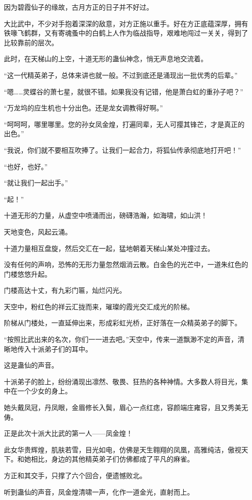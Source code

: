 \begin{this_body}
因为碧霞仙子的缘故，古月方正的日子并不好过。

大比武中，不少对手抱着深深的敌意，对方正施以重手。好在方正底蕴深厚，拥有铁喙飞鹤群，又有寄魂蚤中的白鹤上人作为临战指导，艰难地闯过一关关，得到了比较靠前的层次。

此时，在天梯山的上空，十道无形的蛊仙神念，悄无声息地交流着。

“这一代精英弟子，总体来讲也就一般。不过到底还是涌现出一批优秀的后辈。”

“嗯……灵蝶谷的萧七星，就很不错。如果我没有记错，他是萧白虹的重孙子吧？”

“万龙坞的应生机也十分出色。还是龙女调教得好啊。”

“呵呵呵，哪里哪里。您的孙女凤金煌，打遍同辈，无人可撄其锋芒，才是真正的出色。”

“我说，你们就不要相互吹捧了。让我们一起合力，将狐仙传承彻底地打开吧！”

“也好，也好。”

“就让我们一起出手。”

“起！”

十道无形的力量，从虚空中喷涌而出，磅礴浩瀚，如海啸，如山洪！

天地变色，风起云涌。

十道力量相互盘旋，然后交汇在一起，猛地朝着天梯山某处冲撞过去。

没有任何的声响，恐怖的无形力量忽然烟消云散。白金色的光芒中，一道朱红色的门楼悠悠升起。

门楼高达十丈，有九彩门匾，灿烂闪光。

天空中，粉红色的祥云汇拢而来，璀璨的霞光交汇成光的阶梯。

阶梯从门楼处，一直延伸出来，形成彩虹光桥，正好落在一众精英弟子的脚下。

“按照比武出来的名次，你们一一进去吧。”天空中，传来一道飘渺不定的声音，清晰地传入十派弟子们的耳中。

这是蛊仙的声音。

十派弟子的脸上，纷纷涌现出凛然、敬畏、狂热的各种神情。大多数人将目光，集中在一个少女的身上。

她头戴凤冠，丹凤眼，金眉修长入鬓，眉心一点红痣，容颜端庄雍容，且又秀美无俦。

正是此次十派大比武的第一人——凤金煌！

此女华贵辉煌，肌肤若雪，目光如电，仿佛是天生翱翔的凤凰，高雅纯洁，傲视天下。和她相比，身边的其他精英弟子们仿佛都成了平凡的麻雀。

方正和其交手，只撑了六个回合，便遗憾败北。

听到蛊仙的声音，凤金煌清啸一声，化作一道金光，直射而上。


\end{this_body}
